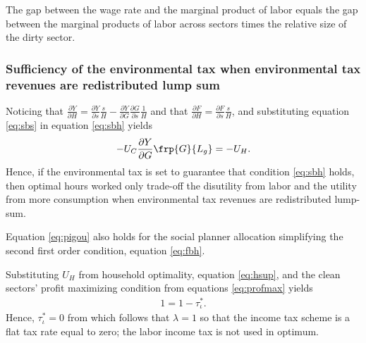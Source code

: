The gap between the wage rate and the marginal product of labor equals the gap between the marginal products of labor across sectors times the relative size of the dirty sector. 

\subsubsection{Sufficiency of the environmental tax when environmental tax revenues are redistributed lump sum}\label{app:incometax0}

Noticing that $\frac{\partial Y}{\partial H}= \frac{\partial Y}{\partial s}\frac{s}{H}-\frac{\partial Y}{\partial G}\frac{\partial G}{\partial s}\frac{1}{H}$ and that $\frac{\partial F}{\partial H}=\frac{\partial F}{\partial s}\frac{s}{H}$, and substituting equation \ref{eq:sbs} in equation \ref{eq:sbh} yields
\begin{align}\label{eq:pigou}
-U_C \frac{\partial Y}{\partial G}\frp{G}{L_g}=-U_H.
\end{align}
Hence, if the environmental tax is set to guarantee that condition \ref{eq:sbh} holds, then optimal hours worked only trade-off the disutility from labor and the utility from more consumption when environmental tax revenues are redistributed lump-sum.

Equation \ref{eq:pigou} also holds for the social planner allocation simplifying the second first order condition, equation \ref{eq:fbh}.


Substituting $U_H$ from household optimality, equation \ref{eq:hsup}, and the clean sectors' profit maximizing condition from equations \ref{eq:profmax} yields
\begin{align}
1=1-\tau^*_\iota.
\end{align}
Hence, $\tau^*_\iota =0$ from which follows that $\lambda =1$ so that the income tax scheme is a flat tax rate equal to zero; the labor income tax is not used in optimum.

%
